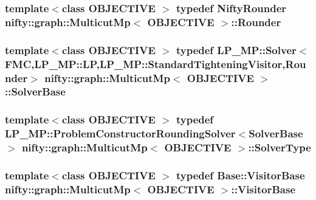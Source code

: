 \subsubsection[{Rounder}]{\setlength{\rightskip}{0pt plus 5cm}template$<$class O\+B\+J\+E\+C\+T\+I\+V\+E $>$ typedef {\bf Nifty\+Rounder} {\bf nifty\+::graph\+::\+Multicut\+Mp}$<$ O\+B\+J\+E\+C\+T\+I\+V\+E $>$\+::{\bf Rounder}}\label{classnifty_1_1graph_1_1MulticutMp_a475f0ecbf40dffd9cdad45867068edf4}
\hypertarget{classnifty_1_1graph_1_1MulticutMp_ab1315bc5fb342e1b41934f2ccfade230}{}
\subsubsection[{Solver\+Base}]{\setlength{\rightskip}{0pt plus 5cm}template$<$class O\+B\+J\+E\+C\+T\+I\+V\+E $>$ typedef L\+P\+\_\+\+M\+P\+::\+Solver$<${\bf F\+M\+C},L\+P\+\_\+\+M\+P\+::\+L\+P,L\+P\+\_\+\+M\+P\+::\+Standard\+Tightening\+Visitor,{\bf Rounder}$>$ {\bf nifty\+::graph\+::\+Multicut\+Mp}$<$ O\+B\+J\+E\+C\+T\+I\+V\+E $>$\+::{\bf Solver\+Base}}\label{classnifty_1_1graph_1_1MulticutMp_ab1315bc5fb342e1b41934f2ccfade230}
\hypertarget{classnifty_1_1graph_1_1MulticutMp_a0466925ff9888879fd24dcb67da4ff1b}{}
\subsubsection[{Solver\+Type}]{\setlength{\rightskip}{0pt plus 5cm}template$<$class O\+B\+J\+E\+C\+T\+I\+V\+E $>$ typedef L\+P\+\_\+\+M\+P\+::\+Problem\+Constructor\+Rounding\+Solver$<${\bf Solver\+Base}$>$ {\bf nifty\+::graph\+::\+Multicut\+Mp}$<$ O\+B\+J\+E\+C\+T\+I\+V\+E $>$\+::{\bf Solver\+Type}}\label{classnifty_1_1graph_1_1MulticutMp_a0466925ff9888879fd24dcb67da4ff1b}
\hypertarget{classnifty_1_1graph_1_1MulticutMp_a4a80c1f30dc62d72203f2ed6e7bdf1eb}{}
\subsubsection[{Visitor\+Base}]{\setlength{\rightskip}{0pt plus 5cm}template$<$class O\+B\+J\+E\+C\+T\+I\+V\+E $>$ typedef {\bf Base\+::\+Visitor\+Base} {\bf nifty\+::graph\+::\+Multicut\+Mp}$<$ O\+B\+J\+E\+C\+T\+I\+V\+E $>$\+::{\bf Visitor\+Base}}\label{classnifty_1_1graph_1_1MulticutMp_a4a80c1f30dc62d72203f2ed6e7bdf1eb}
\hypertarget{classnifty_1_1graph_1_1MulticutMp_af4895ae0b773b8f102cb9644551cd38d}{}
